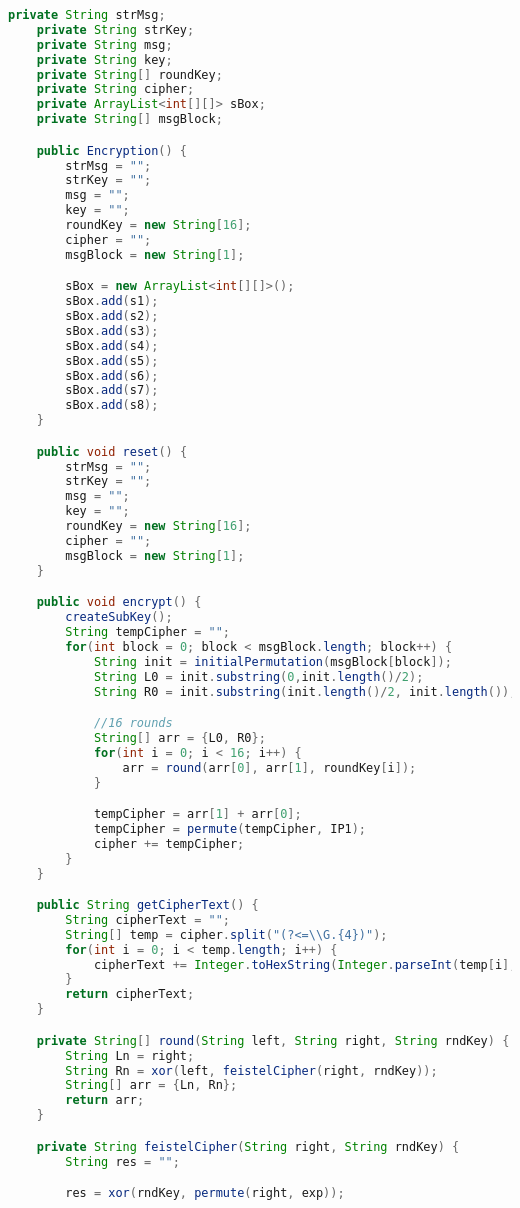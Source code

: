 \begin{lstlisting}[language=Java,basicstyle=\tiny,caption=DESEncryption.java]
    private String strMsg;
    private String strKey;
    private String msg;
    private String key;
    private String[] roundKey;
    private String cipher;
    private ArrayList<int[][]> sBox;
    private String[] msgBlock;

    public Encryption() {
        strMsg = "";
        strKey = "";
        msg = "";
        key = "";
        roundKey = new String[16];
        cipher = "";
        msgBlock = new String[1];

        sBox = new ArrayList<int[][]>();
        sBox.add(s1);
        sBox.add(s2);
        sBox.add(s3);
        sBox.add(s4);
        sBox.add(s5);
        sBox.add(s6);
        sBox.add(s7);
        sBox.add(s8);
    }

    public void reset() {
        strMsg = "";
        strKey = "";
        msg = "";
        key = "";
        roundKey = new String[16];
        cipher = "";
        msgBlock = new String[1];
    }

    public void encrypt() {
        createSubKey();
        String tempCipher = "";
        for(int block = 0; block < msgBlock.length; block++) {
            String init = initialPermutation(msgBlock[block]);
            String L0 = init.substring(0,init.length()/2);
            String R0 = init.substring(init.length()/2, init.length());

            //16 rounds
            String[] arr = {L0, R0};
            for(int i = 0; i < 16; i++) {
                arr = round(arr[0], arr[1], roundKey[i]);
            }

            tempCipher = arr[1] + arr[0];
            tempCipher = permute(tempCipher, IP1);
            cipher += tempCipher;
        }
    }

    public String getCipherText() {
        String cipherText = "";
        String[] temp = cipher.split("(?<=\\G.{4})");
        for(int i = 0; i < temp.length; i++) {
            cipherText += Integer.toHexString(Integer.parseInt(temp[i], 2));
        }
        return cipherText;
    }

    private String[] round(String left, String right, String rndKey) {
        String Ln = right;
        String Rn = xor(left, feistelCipher(right, rndKey));
        String[] arr = {Ln, Rn};
        return arr;
    }

    private String feistelCipher(String right, String rndKey) {
        String res = "";

        res = xor(rndKey, permute(right, exp));


\end{lstlisting}
